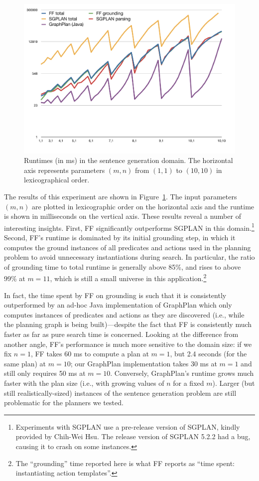 \begin{figure}
  \centering
  \includegraphics[width=1\columnwidth]{pic-runtime-modifiers-with-sgplan}
  \caption{Runtimes (in ms) in the sentence generation domain.  The
    horizontal axis represents parameters $(m,n)$ from $(1,1)$ to
    $(10,10)$ in lexicographical order.}
  \label{fig:runtimes-crisp}
\end{figure}

The results of this experiment are shown in
Figure~\ref{fig:runtimes-crisp}. The input parameters $(m,n)$ are plotted
in lexicographic order on the horizontal axis and the runtime is shown in
milliseconds on the vertical axis. These results reveal a number of
interesting insights. First, FF significantly outperforms
SGPLAN in this domain.\footnote{Experiments with SGPLAN use a
 pre-release version of SGPLAN, kindly provided by Chih-Wei Hsu. The
 release version of SGPLAN 5.2.2 had a bug, causing it to crash on some
 instances.}
Second, FF's runtime is dominated by its initial grounding step, in which
it computes the ground instances of all predicates and actions used in the
planning problem to avoid unnecessary instantiations during search. In
particular, the ratio of grounding time to total runtime is generally above
85\%, and rises to above 99\% at $m=11$, which is still a small universe in
this application.\footnote{The
  ``grounding'' time reported here is what FF reports as ``time spent:
  instantiating action templates''.} 

In fact, the time spent by FF on grounding is such that it is consistently
outperformed by an ad-hoc Java implementation of GraphPlan which only
computes instances of predicates and actions as they are discovered (i.e.,
while the planning graph is being built)---despite the fact that FF is
consistently much faster as far as pure search time is concerned.  Looking
at the difference from another angle, FF's performance is much more
sensitive to the domain size: if we fix $n=1$, FF takes 60 ms to compute a
plan at $m=1$, but 2.4 seconds (for the same plan) at $m=10$; our GraphPlan
implementation takes 30 ms at $m=1$ and still only requires 50 ms at
$m=10$.  Conversely, GraphPlan's runtime grows much faster with the plan
size (i.e., with growing values of $n$ for a fixed $m$).  Larger (but still
realistically-sized) instances of the sentence generation problem are still
problematic for the planners we tested.


